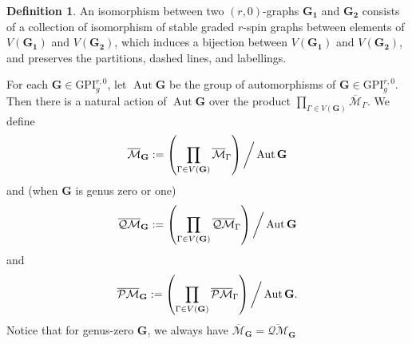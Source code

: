 \documentclass[11pt]{amsart}
\theoremstyle{definition}
\newtheorem{dfn}[dummy]{Definition}
\theoremstyle{remark}
\newcommand{\oPMb}{{\overline{\mathcal{PM}}}}
\newcommand{\oQMb}{{\overline{\mathcal{QM}}}}
\newcommand{\<}{\left<}
\renewcommand{\>}{\right>}
\numberwithin{equation}{section}
\def\Mbar{{\overline{\mathcal M}}}
\def\GPI{{\text{GPI}}}
\begin{document}
\begin{dfn}
    An isomorphism between two $(r,0)$-graphs $\mathbf{G_1}$ and $\mathbf{G_2}$ consists of a collection of isomorphism of stable graded $r$-spin graphs between elements of $V(\mathbf{G_1})$ and $V(\mathbf{G_2})$, which induces a bijection between $V(\mathbf{G_1})$ and $V(\mathbf{G_2})$, and preserves the partitions, dashed lines, and %
labellings.
\end{dfn}

For each %
$\mathbf{G}\in \GPI^{r,0}_g$, let $\operatorname{Aut} \mathbf{G}$ be the group of automorphisms of %
$\mathbf{G}\in \GPI^{r,0}_g$. Then there %
is a natural action of $\operatorname{Aut} \mathbf{G}$ over the product $\prod_{\Gamma\in V(\mathbf{G})} \Mbar_\Gamma$. We define 
$$
\Mbar_\mathbf{G}:=\left(\prod_{\Gamma\in V(\mathbf{G})} \Mbar_\Gamma\right)\bigg\slash \operatorname{Aut} \mathbf{G}
$$
and (when $\mathbf{G}$ is genus zero or one)
$$
\oQMb_\mathbf{G}:=\left(\prod_{\Gamma\in V(\mathbf{G})} \oQMb_\Gamma\right)\bigg\slash \operatorname{Aut} \mathbf{G}
$$
and
$$
\oPMb_\mathbf{G}:=\left(\prod_{\Gamma\in V(\mathbf{G})} \oPMb_\Gamma\right)\bigg\slash \operatorname{Aut} \mathbf{G}.
$$
Notice that for %
genus-zero $\mathbf{G}$, we %
always %
have  $\Mbar_\mathbf{G}=\oQMb_\mathbf{G}$
\end{document}
